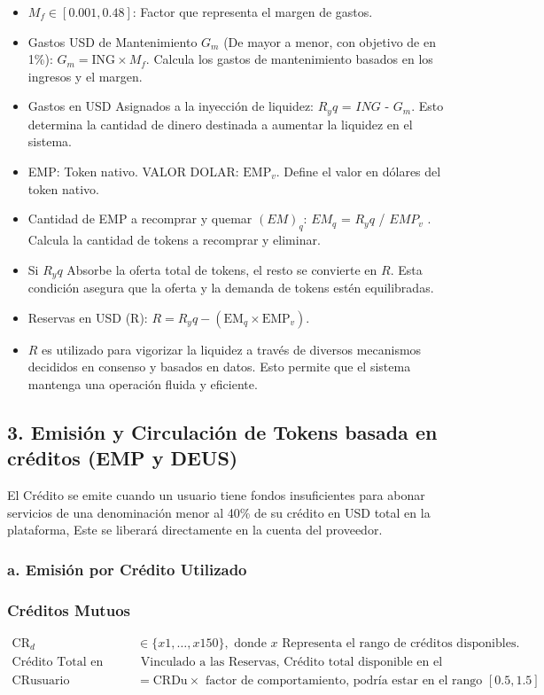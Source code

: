\documentclass{article}
\begin{document}
\begin{itemize}
    \item \( M_f \in [0.001, 0.48] \): Factor que representa el margen de gastos.
    \item Gastos USD de Mantenimiento \( G_m \) (De mayor a menor, con objetivo de en 1\%): \( G_m = \text{ING} \times M_f \). Calcula los gastos de mantenimiento basados en los ingresos y el margen.
    \item Gastos en USD Asignados a la inyección de liquidez: $R_yq$ = ${ING}$ - $G_m$. Esto determina la cantidad de dinero destinada a aumentar la liquidez en el sistema.
    \item EMP: Token nativo. VALOR DOLAR: \( \text{EMP}_v \). Define el valor en dólares del token nativo.
    \item Cantidad de EMP a recomprar y quemar $(EM)_q$: ${EM}_q$ = $R_yq$ / ${EMP}_v$ . Calcula la cantidad de tokens a recomprar y eliminar.
    \item Si \( R_yq \) Absorbe la oferta total de tokens, el resto se convierte en \( R \). Esta condición asegura que la oferta y la demanda de tokens estén equilibradas.
    \item Reservas en USD (R): \( R = R_yq - (\text{EM}_q \times \text{EMP}_v) \).
    \item \( R \) es utilizado para vigorizar la liquidez a través de diversos mecanismos decididos en consenso y basados en datos. Esto permite que el sistema mantenga una operación fluida y eficiente.
\end{itemize}



\subsection*{3. Emisión y Circulación de Tokens basada en créditos (EMP y DEUS)}
El Crédito se emite cuando un usuario tiene fondos insuficientes para abonar servicios de una denominación menor al 40\% de su crédito en USD total en la plataforma, Este se liberará directamente en la cuenta del proveedor. 

\subsubsection*{a. Emisión por Crédito Utilizado}
\subsubsection*{Créditos Mutuos}
\begin{align*}
    \text{CR}_d & \in \{x1,\ldots,x150\}, \text{ donde } x \text{ Representa el rango de créditos disponibles.} \\
    \text{Crédito Total en USD (CRDt):} & \text{ Vinculado a las Reservas, Crédito total disponible en el sistema.} \\
    \text{CRusuario} & = \text{CRDu} \times \text{ factor de comportamiento, podría estar en el rango } [0.5, 1.5] 
\end{align*}
\end{document}
